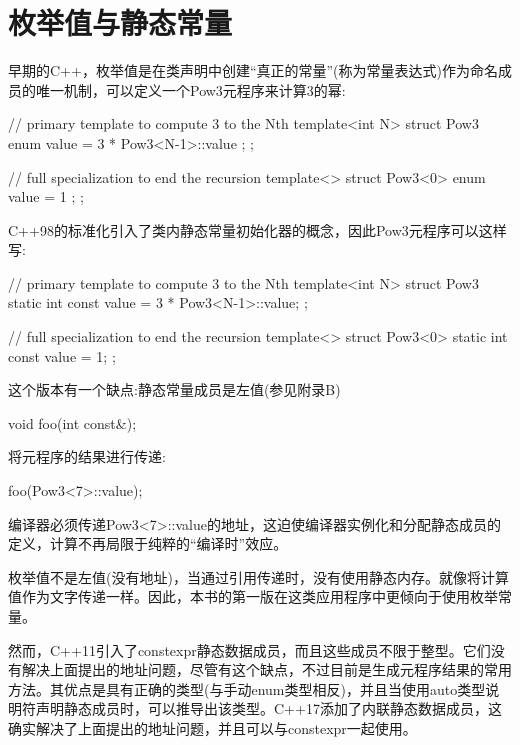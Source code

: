 \section{枚举值与静态常量}

早期的C++，枚举值是在类声明中创建“真正的常量”(称为常量表达式)作为命名成员的唯一机制，可以定义一个Pow3元程序来计算3的幂:

\begin{cpp}
// primary template to compute 3 to the Nth
template<int N>
struct Pow3 {
	enum { value = 3 * Pow3<N-1>::value };
};

// full specialization to end the recursion
template<>
struct Pow3<0> {
	enum { value = 1 };
};
\end{cpp}

C++98的标准化引入了类内静态常量初始化器的概念，因此Pow3元程序可以这样写:

\begin{cpp}
// primary template to compute 3 to the Nth
template<int N>
struct Pow3 {
	static int const value = 3 * Pow3<N-1>::value;
};

// full specialization to end the recursion
template<>
struct Pow3<0> {
	static int const value = 1;
};
\end{cpp}

这个版本有一个缺点:静态常量成员是左值(参见附录B)

\begin{cpp}
void foo(int const&);
\end{cpp}

将元程序的结果进行传递:

\begin{cpp}
foo(Pow3<7>::value);
\end{cpp}

编译器必须传递Pow3<7>::value的地址，这迫使编译器实例化和分配静态成员的定义，计算不再局限于纯粹的“编译时”效应。

枚举值不是左值(没有地址)，当通过引用传递时，没有使用静态内存。就像将计算值作为文字传递一样。因此，本书的第一版在这类应用程序中更倾向于使用枚举常量。

然而，C++11引入了constexpr静态数据成员，而且这些成员不限于整型。它们没有解决上面提出的地址问题，尽管有这个缺点，不过目前是生成元程序结果的常用方法。其优点是具有正确的类型(与手动enum类型相反)，并且当使用auto类型说明符声明静态成员时，可以推导出该类型。C++17添加了内联静态数据成员，这确实解决了上面提出的地址问题，并且可以与constexpr一起使用。























